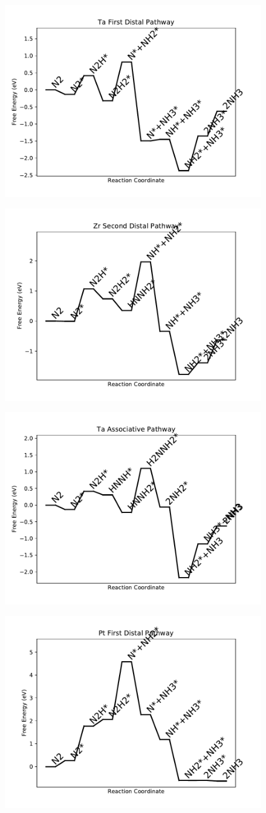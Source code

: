 \documentclass[journal=jacsat,manuscript=article]{achemso}
\begin{document}
\begin{figure}
\includegraphics[width=0.5\linewidth]{data/plots/Ta_distal_1.pdf}
\label{fig:Ta_distal_1}
\end{figure}

\begin{figure}
\includegraphics[width=0.5\linewidth]{data/plots/Zr_distal_2.pdf}
\label{fig:Zr_distal_2}
\end{figure}

\begin{figure}
\includegraphics[width=0.5\linewidth]{data/plots/Ta_associative.pdf}
\label{fig:Ta_associative}
\end{figure}

\begin{figure}
\includegraphics[width=0.5\linewidth]{data/plots/Pt_distal_1.pdf}
\label{fig:Pt_distal_1}
\end{figure}
\end{document}
